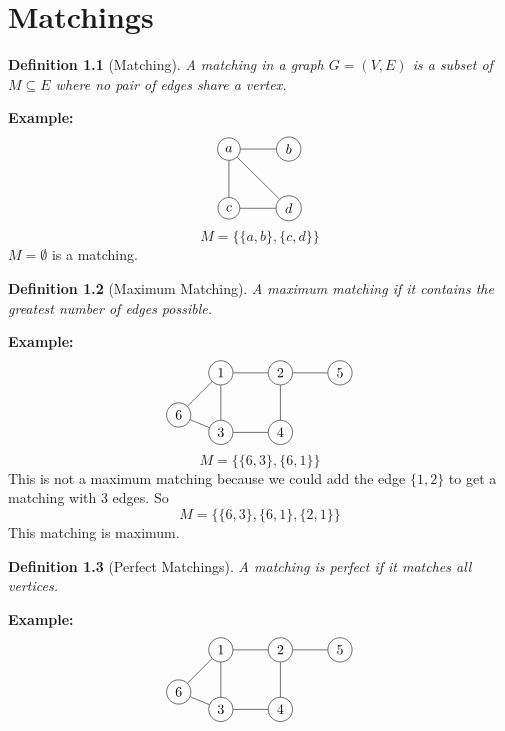 \documentclass[openany]{report}
\newtheorem{definition}{Definition}[section]
\begin{document}
\chapter{Matchings}
\begin{definition}[Matching]
    A \emph{matching} in a graph $G = (V,E)$ is a subset of $M \subseteq E$ where no pair of edges share a vertex.
\end{definition}
\textbf{Example:}
\[
\begin{tikzpicture}[node distance={15mm}, main/.style ={draw, circle}]
    \node[main] (1) {$a$};
    \node[main] (2) [right of=1] {$b$};
    \node[main] (3) [below of=1] {$c$};
    \node[main] (4) [below of=2] {$d$};
    \draw (1) -- (2);
    \draw (1) -- (3);
    \draw (1) -- (4);
    \draw (3)--(4);
\end{tikzpicture}
\]
\[M = \{\{a,b\}, \{c,d\}\}\]
$M = \emptyset$ is a matching. 
\begin{definition}[Maximum Matching]
    A \emph{maximum matching} if it contains the greatest number of edges possible. 
\end{definition}
\noindent
\textbf{Example:}
\[
    \begin{tikzpicture}[node distance={15mm}, main/.style ={draw, circle}]
        \node[main] (1) {1};
        \node[main] (2) [right of=1] {2};
        \node[main] (3) [below of=1] {3};
        \node[main] (4) [below of=2] {4};
        \node[main] (5) [right of=2] {5};
        \node[main] (6) [below left of=1] {6};
        \draw (1) -- (2);
        \draw (1) -- (3);
        \draw (3) -- (4);
        \draw (2)--(4);
        \draw (6)--(1);
        \draw (6)--(3);
        \draw (2) -- (5);
    \end{tikzpicture}
\]
\[M = \{\{6,3\}, \{6,1\}\}\]
This is not a maximum matching because we could add the edge $\{1,2\}$ to get a matching with 3 edges. So 
\[M = \{\{6,3\}, \{6,1\},\{2,1\} \}\]
This matching is maximum.
\begin{definition}[Perfect Matchings]
    A matching is \emph{perfect} if it matches \emph{all} vertices.
\end{definition}
\noindent
\textbf{Example:}
\[
    \begin{tikzpicture}[node distance={15mm}, main/.style ={draw, circle}]
        \node[main] (1) {1};
        \node[main] (2) [right of=1] {2};
        \node[main] (3) [below of=1] {3};
        \node[main] (4) [below of=2] {4};
        \node[main] (5) [right of=2] {5};
        \node[main] (6) [below left of=1] {6};
        \draw (1) -- (2);
        \draw (1) -- (3);
        \draw (3) -- (4);
        \draw (2)--(4);
        \draw (6)--(1);
        \draw (6)--(3);
        \draw (2) -- (5);
    \end{tikzpicture}
\]
\end{document}
